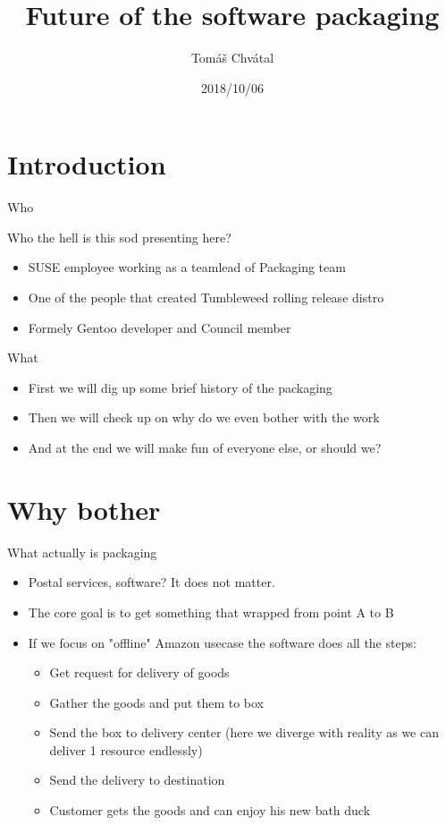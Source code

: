 \documentclass{beamer}
\author{Tom\'{a}\v{s} Chv\'{a}tal\newline {\small tchvatal@suse.com}\newline {\small SUSE/L3 - Packaging}}
\title{Future of the software packaging}
\date{2018/10/06}
\begin{document}
\begin{frame}[t,plain]
\titlepage
\end{frame}

\section{Introduction}

\begin{frame}[t]{Who}
    \begin{center}Who the hell is this sod presenting here?\end{center}
	\begin{itemize}
	\item SUSE employee working as a teamlead of Packaging team
    \item One of the people that created Tumbleweed rolling release distro
    \item Formely Gentoo developer and Council member
	\end{itemize}
\end{frame}

\begin{frame}[t]{What}
	\begin{itemize}
	\item First we will dig up some brief history of the packaging
    \item Then we will check up on why do we even bother with the work
    \item And at the end we will make fun of everyone else, or should we?
	\end{itemize}
\end{frame}

\section{Why bother}

\begin{frame}[t]{What actually is packaging}
	\begin{itemize}
	\item Postal services, software? It does not matter.
	\item The core goal is to get something that wrapped from point A to B
	\item If we focus on "offline" Amazon usecase the software does all the steps:
	\begin{itemize}
	\item Get request for delivery of goods
	\item Gather the goods and put them to box
	\item Send the box to delivery center (here we diverge with reality as we can deliver 1 resource endlessly)
	\item Send the delivery to destination
	\item Customer gets the goods and can enjoy his new bath duck
	\end{itemize}
	\end{itemize}
\end{frame}
\end{document}
